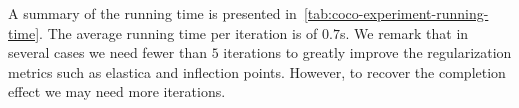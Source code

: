 \documentclass[review]{siamart220329}
\begin{document}
A summary of the running time is presented in~\cref{tab:coco-experiment-running-time}. The average running time per iteration is of $0.7$s. We remark that in several cases we need fewer than $5$ iterations to greatly improve the regularization metrics such as elastica and inflection points. However, to recover the completion effect we may need more iterations.
%
%
\begin{figure}
\center
{}


\end{figure}
\end{document}
